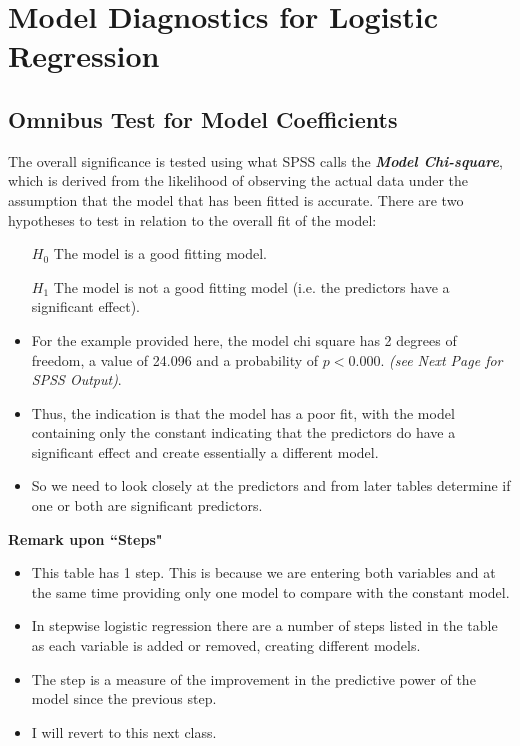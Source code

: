 \documentclass[a4paper,12pt]{article}
\begin{document}
\section{Model Diagnostics for Logistic Regression}


\subsection{Omnibus Test for Model Coefficients}
The overall significance is tested using what SPSS calls the \textbf{\textit{Model Chi-square}}, which is derived from the likelihood of observing the actual data under the assumption that the model that has been fitted is accurate. There are two hypotheses to test in relation to the overall fit of the model:

\begin{framed}
\begin{itemize}
	\item[$H_0$] The model is a good fitting model.
	\item[$H_1$] The model is not a good fitting model (i.e. the predictors have a significant effect).
\end{itemize}
\end{framed}

\begin{itemize}
	\item For the example provided here, the model chi square has 2 degrees of freedom, a value of 24.096 and a probability of $p < 0.000$. \textit{(see Next Page for SPSS Output)}.
	
	\item Thus, the indication is that the model has a poor fit, with the model containing only the constant indicating that the predictors do have a significant effect and create essentially a different model. 
	\item So we need to look closely at
	the predictors and from later tables determine if one or both are significant predictors.
\end{itemize}
\bigskip

\noindent \textbf{Remark upon ``Steps"}
\begin{itemize}
	\item This table has 1 step. This is because we are entering both variables and at the same
	time providing only one model to compare with the constant model. 
	\item In stepwise logistic regression there are a number of steps listed in the table as each variable is added or
	removed, creating different models. 
	\item The step is a measure of the improvement in the
	predictive power of the model since the previous step. 
	\item I will revert to this next class.
\end{itemize}
\end{document}
